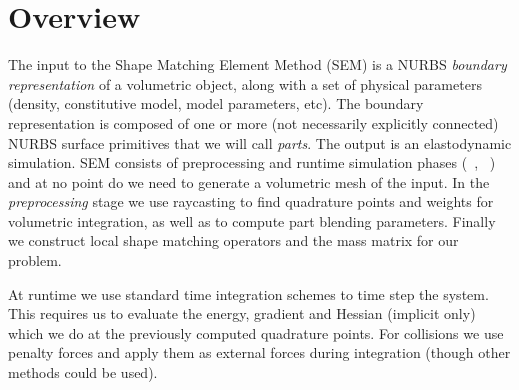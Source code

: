 \section{Overview}
The input to the Shape Matching Element Method (SEM)  is a NURBS \emph{boundary representation} of a volumetric object, along with a set of physical parameters 
(density, constitutive model, model parameters, etc). 
The boundary representation is composed of one or more (not necessarily explicitly connected) NURBS surface primitives that we will call \emph{parts}.
The output is an elastodynamic simulation. 
SEM consists of preprocessing and runtime simulation phases (~, ~) and at no point do we need to generate a volumetric mesh of the input. 
In the \emph{preprocessing} stage we use raycasting to find quadrature points and weights for volumetric integration, as well as to compute part blending parameters. 
Finally we construct local shape matching operators and the mass matrix for our problem. 

At runtime we use standard time integration schemes to time step the system. 
This requires us to evaluate the energy, gradient and Hessian (implicit only) which we do at the previously computed quadrature points. 
For collisions we use penalty forces and apply them as external forces during integration (though other methods could be used).

